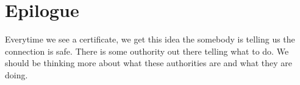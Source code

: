 \chapter{Epilogue}
\noindent
Everytime we see a certificate, we get this idea the somebody is telling us the
connection is safe. There is some outhority out there telling what to do.
We should be thinking more about what these authorities are and what they are
doing.

